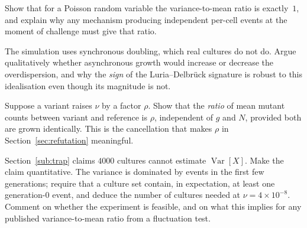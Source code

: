 \begin{exercise}
Show that for a Poisson random variable the variance-to-mean ratio is exactly~$1$,
and explain why any mechanism producing independent per-cell events at the moment
of challenge must give that ratio.
\end{exercise}

\begin{exercise}
The simulation uses synchronous doubling, which real cultures do not do. Argue
qualitatively whether asynchronous growth would increase or decrease the
overdispersion, and why the \emph{sign} of the Luria--Delbrück signature is robust
to this idealisation even though its magnitude is not.
\end{exercise}

\begin{exercise}[(harder)]
Suppose a variant raises $\nu$ by a factor $\rho$. Show that the \emph{ratio} of
mean mutant counts between variant and reference is $\rho$, independent of $g$
and $N$, provided both are grown identically. This is the cancellation that makes
$\rho$ in Section~\ref{sec:refutation} meaningful.
\end{exercise}

\begin{exercise}[(harder)]
Section~\ref{sub:trap} claims $4000$ cultures cannot estimate
$\operatorname{Var}[X]$. Make the claim quantitative. The variance is dominated
by events in the first few generations; require that a culture set contain, in
expectation, at least one generation-$0$ event, and deduce the number of
cultures needed at $\nu = 4\times10^{-8}$. Comment on whether the experiment is
feasible, and on what this implies for any published variance-to-mean ratio from
a fluctuation test.
\end{exercise}

